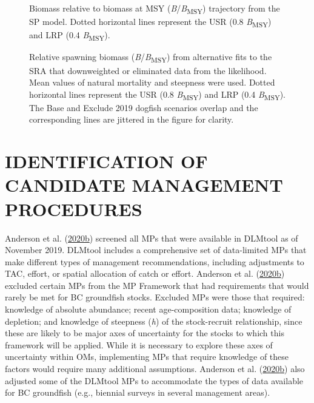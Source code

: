 \documentclass[11pt]{book}
\begin{document}
\begin{figure}[htb]

{\centering {} 

}

\caption{Biomass relative to biomass at MSY (\emph{B}/\emph{B}\textsubscript{MSY}) trajectory from the SP model. Dotted horizontal lines represent the USR (0.8 \emph{B}\textsubscript{MSY}) and LRP (0.4 \emph{B}\textsubscript{MSY}).}\label{fig:spm-biomass}
\end{figure}

\begin{figure}[htb]

{\centering {} 

}

\caption{Relative spawning biomass (\emph{B}/\emph{B}\textsubscript{MSY}) from alternative fits to the SRA that downweighted or eliminated data from the likelihood. Mean values of natural mortality and steepness were used. Dotted horizontal lines represent the USR (0.8 \emph{B}\textsubscript{MSY}) and LRP (0.4 \emph{B}\textsubscript{MSY}). The Base and Exclude 2019 dogfish scenarios overlap and the corresponding lines are jittered in the figure for clarity.}\label{fig:alt-SRA-fit}
\end{figure}
\clearpage

\hypertarget{sec:mp}{%
\section{IDENTIFICATION OF CANDIDATE MANAGEMENT PROCEDURES}\label{sec:mp}}

Anderson et al. (\protect\hyperlink{ref-anderson2020gfmp}{2020}\protect\hyperlink{ref-anderson2020gfmp}{b}) screened all MPs that were available in DLMtool as of November 2019. DLMtool includes a comprehensive set of data-limited MPs that make different types of management recommendations, including adjustments to TAC, effort, or spatial allocation of catch or effort. Anderson et al. (\protect\hyperlink{ref-anderson2020gfmp}{2020}\protect\hyperlink{ref-anderson2020gfmp}{b}) excluded certain MPs from the MP Framework that had requirements that would rarely be met for BC groundfish stocks. Excluded MPs were those that required: knowledge of absolute abundance; recent age-composition data; knowledge of depletion; and knowledge of steepness (\emph{h}) of the stock-recruit relationship, since these are likely to be major axes of uncertainty for the stocks to which this framework will be applied. While it is necessary to explore these axes of uncertainty within OMs, implementing MPs that require knowledge of these factors would require many additional assumptions. Anderson et al. (\protect\hyperlink{ref-anderson2020gfmp}{2020}\protect\hyperlink{ref-anderson2020gfmp}{b}) also adjusted some of the DLMtool MPs to accommodate the types of data available for BC groundfish (e.g., biennial surveys in several management areas).
\end{document}
